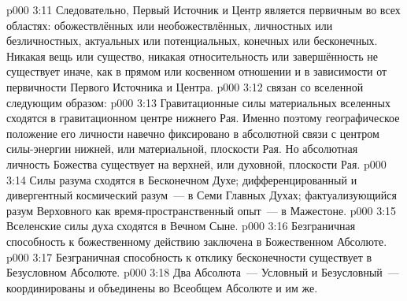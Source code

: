 \vs p000 3:11 Следовательно, Первый Источник и Центр является первичным во всех областях: обожествлённых или необожествлённых, личностных или безличностных, актуальных или потенциальных, конечных или бесконечных. Никакая вещь или существо, никакая относительность или завершённость не существует иначе, как в прямом или косвенном отношении и в зависимости от первичности Первого Источника и Центра.
\vs p000 3:12 \pc {} связан со вселенной следующим образом:
\vs p000 3:13 Гравитационные силы материальных вселенных сходятся в гравитационном центре нижнего Рая. Именно поэтому географическое положение его личности навечно фиксировано в абсолютной связи с центром силы\hyp{}энергии нижней, или материальной, плоскости Рая. Но абсолютная личность Божества существует на верхней, или духовной, плоскости Рая.
\vs p000 3:14 Силы разума сходятся в Бесконечном Духе; дифференцированный и дивергентный космический разум~--- в Семи Главных Духах; фактуализующийся разум Верховного как время\hyp{}пространственный опыт~--- в Мажестоне.
\vs p000 3:15 Вселенские силы духа сходятся в Вечном Сыне.
\vs p000 3:16 Безграничная способность к божественному действию заключена в Божественном Абсолюте.
\vs p000 3:17 Безграничная способность к отклику бесконечности существует в Безусловном Абсолюте.
\vs p000 3:18 Два Абсолюта~--- Условный и Безусловный~--- координированы и объединены во Всеобщем Абсолюте и им же.
